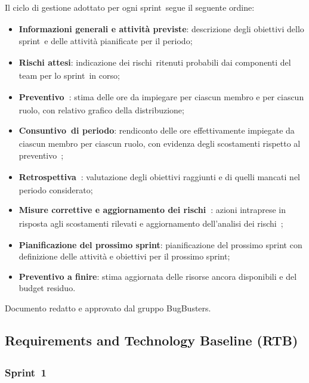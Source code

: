 \documentclass[a4paper,12pt]{article}
\newcommand{\pediceG}{\texorpdfstring{\textsubscript{\scalebox{0.6}{\textbf{G}}}~}{G}}
\begin{document}
Il ciclo di gestione adottato per ogni sprint\pediceG segue il seguente ordine:
\begin{itemize}
\item \textbf{Informazioni generali e attività previste}: descrizione degli obiettivi dello sprint\pediceG e delle attività pianificate per il periodo;
\item \textbf{Rischi attesi}: indicazione dei rischi\pediceG ritenuti probabili dai componenti del team per lo sprint\pediceG in corso;
\item \textbf{Preventivo\pediceG}: stima delle ore da impiegare per ciascun membro e per ciascun ruolo, con relativo grafico della distribuzione;
\item \textbf{Consuntivo\pediceG di periodo}: rendiconto delle ore effettivamente impiegate da ciascun membro per ciascun ruolo, con evidenza degli scostamenti rispetto al preventivo\pediceG;
\item \textbf{Retrospettiva\pediceG}: valutazione degli obiettivi raggiunti e di quelli mancati nel periodo considerato;
\item \textbf{Misure correttive e aggiornamento dei rischi\pediceG}: azioni intraprese in risposta agli scostamenti rilevati e aggiornamento dell'analisi dei rischi\pediceG;
\item \textbf{Pianificazione del prossimo sprint}: pianificazione del prossimo sprint con definizione delle attività e obiettivi per il prossimo sprint;
\item \textbf{Preventivo a finire}: stima aggiornata delle risorse ancora disponibili e del budget residuo.
\end{itemize}

\vfill
\begin{center}
    {\small\color{darkgray} Documento redatto e approvato dal gruppo BugBusters.}
\end{center}

\newpage
\subsection{Requirements and Technology Baseline (RTB)\pediceG}

\subsubsection{Sprint\pediceG 1}
\end{document}
